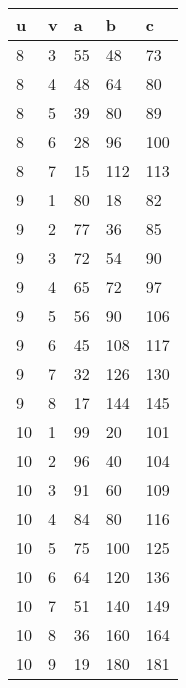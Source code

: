 \documentclass[letterpaper, 12pt]{article}
\theoremstyle{mystyle}
\begin{document}
\begin{tabular}{l l l l l}
    u   & v   & a   & b   & c   \\
    \hline
    8 & 3 & 55 & 48 & 73 \\
    8 & 4 & 48 & 64 & 80 \\
    8 & 5 & 39 & 80 & 89 \\
    8 & 6 & 28 & 96 & 100 \\
    8 & 7 & 15 & 112 & 113 \\
    9 & 1 & 80 & 18 & 82 \\
    9 & 2 & 77 & 36 & 85 \\
    9 & 3 & 72 & 54 & 90 \\
    9 & 4 & 65 & 72 & 97 \\
    9 & 5 & 56 & 90 & 106 \\
    9 & 6 & 45 & 108 & 117 \\
    9 & 7 & 32 & 126 & 130 \\
    9 & 8 & 17 & 144 & 145 \\
    10 & 1 & 99 & 20 & 101 \\
    10 & 2 & 96 & 40 & 104 \\
    10 & 3 & 91 & 60 & 109 \\
    10 & 4 & 84 & 80 & 116 \\
    10 & 5 & 75 & 100 & 125 \\
    10 & 6 & 64 & 120 & 136 \\
    10 & 7 & 51 & 140 & 149 \\
    10 & 8 & 36 & 160 & 164 \\
    10 & 9 & 19 & 180 & 181 \\
\end{tabular}
\end{document}
